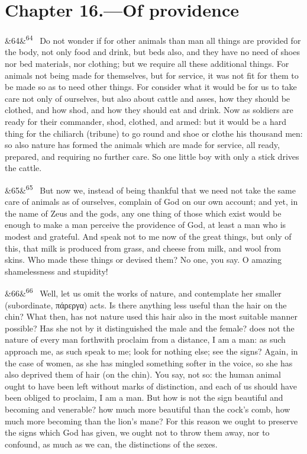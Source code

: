 \documentclass[12pt]{article}
\newcommand{\para}[1][]{\par\noindent\ifx&#1&\else\textsuperscript{\footnotesize #1}~\fi}
\begin{document}
\section*{Chapter 16.---Of providence}

\para[64] Do not wonder if for other animals than man all things are provided for the body, not only food and drink, but beds also, and they have no need of shoes nor bed materials, nor clothing; but we require all these additional things. For animals not being made for themselves, but for service, it was not fit for them to be made so as to need other things. For consider what it would be for us to take care not only of ourselves, but also about cattle and asses, how they should be clothed, and how shod, and how they should eat and drink. Now as soldiers are ready for their commander, shod, clothed, and armed: but it would be a hard thing for the chiliarch (tribune) to go round and shoe or clothe his thousand men: so also nature has formed the animals which are made for service, all ready, prepared, and requiring no further care. So one little boy with only a stick drives the cattle.

\para[65] But now we, instead of being thankful that we need not take the same care of animals as of ourselves, complain of God on our own account; and yet, in the name of Zeus and the gods, any one thing of those which exist would be enough to make a man perceive the providence of God, at least a man who is modest and grateful. And speak not to me now of the great things, but only of this, that milk is produced from grass, and cheese from milk, and wool from skins. Who made these things or devised them? No one, you say. O amazing shamelessness and stupidity!

\para[66] Well, let us omit the works of nature, and contemplate her smaller (subordinate, πάρεργα) acts. Is there anything less useful than the hair on the chin? What then, has not nature used this hair also in the most suitable manner possible? Has she not by it distinguished the male and the female? does not the nature of every man forthwith proclaim from a distance, I am a man: as such approach me, as such speak to me; look for nothing else; see the signs? Again, in the case of women, as she has mingled something softer in the voice, so she has also deprived them of hair (on the chin). You say, not so: the human animal ought to have been left without marks of distinction, and each of us should have been obliged to proclaim, I am a man. But how is not the sign beautiful and becoming and venerable? how much more beautiful than the cock's comb, how much more becoming than the lion's mane? For this reason we ought to preserve the signs which God has given, we ought not to throw them away, nor to confound, as much as we can, the distinctions of the sexes.
\end{document}
